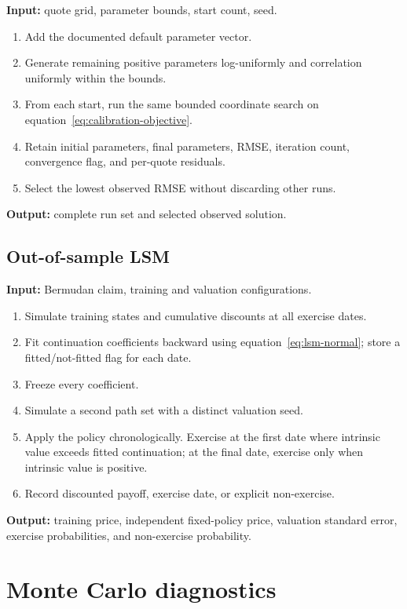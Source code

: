 \documentclass[11pt]{article}
\numberwithin{equation}{section}
\theoremstyle{definition}
\theoremstyle{remark}
\begin{document}
\noindent\textbf{Input:} quote grid, parameter bounds, start count, seed.
\begin{enumerate}
  \item Add the documented default parameter vector.
  \item Generate remaining positive parameters log-uniformly and correlation
  uniformly within the bounds.
  \item From each start, run the same bounded coordinate search on
  equation~\eqref{eq:calibration-objective}.
  \item Retain initial parameters, final parameters, RMSE, iteration count,
  convergence flag, and per-quote residuals.
  \item Select the lowest observed RMSE without discarding other runs.
\end{enumerate}
\noindent\textbf{Output:} complete run set and selected observed solution.

\subsection{Out-of-sample LSM}

\noindent\textbf{Input:} Bermudan claim, training and valuation configurations.
\begin{enumerate}
  \item Simulate training states and cumulative discounts at all exercise dates.
  \item Fit continuation coefficients backward using
  equation~\eqref{eq:lsm-normal}; store a fitted/not-fitted flag for each date.
  \item Freeze every coefficient.
  \item Simulate a second path set with a distinct valuation seed.
  \item Apply the policy chronologically. Exercise at the first date where
  intrinsic value exceeds fitted continuation; at the final date, exercise only
  when intrinsic value is positive.
  \item Record discounted payoff, exercise date, or explicit non-exercise.
\end{enumerate}
\noindent\textbf{Output:} training price, independent fixed-policy price,
valuation standard error, exercise probabilities, and non-exercise probability.

\section{Monte Carlo diagnostics}
\label{app:mc-table}
\end{document}
